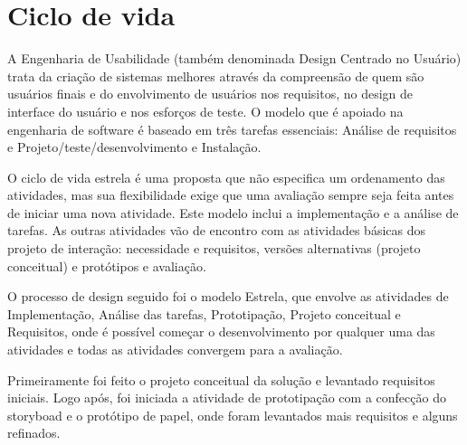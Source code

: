 \chapter{Ciclo de vida}

  A Engenharia de Usabilidade (também denominada Design Centrado no Usuário) trata da criação de sistemas melhores através da 
  compreensão de quem são usuários finais e do envolvimento de usuários nos requisitos, no design de interface do usuário e nos
  esforços de teste. O modelo que é apoiado na engenharia de software é baseado em três tarefas essenciais: Análise de requisitos
  e Projeto/teste/desenvolvimento e Instalação.
  
  O ciclo de vida estrela é uma proposta que não especifica um ordenamento das atividades, mas sua flexibilidade exige que uma
  avaliação sempre seja feita antes de iniciar uma nova atividade. Este modelo inclui a implementação e a análise de tarefas.
  As  outras atividades vão de encontro com as atividades básicas dos projeto de interação: necessidade e requisitos, versões 
  alternativas (projeto conceitual) e protótipos e avaliação.
  
  O processo de design seguido foi o modelo Estrela, que envolve as atividades de Implementação, Análise das tarefas, Prototipação,
  Projeto conceitual e Requisitos, onde é possível começar o desenvolvimento por qualquer uma das atividades e todas as atividades
  convergem para a avaliação.
  
  Primeiramente foi feito o projeto conceitual da solução e levantado requisitos iniciais. Logo após, foi iniciada a atividade
  de prototipação com a confecção do storyboad e o protótipo de papel, onde foram levantados mais requisitos e alguns refinados.